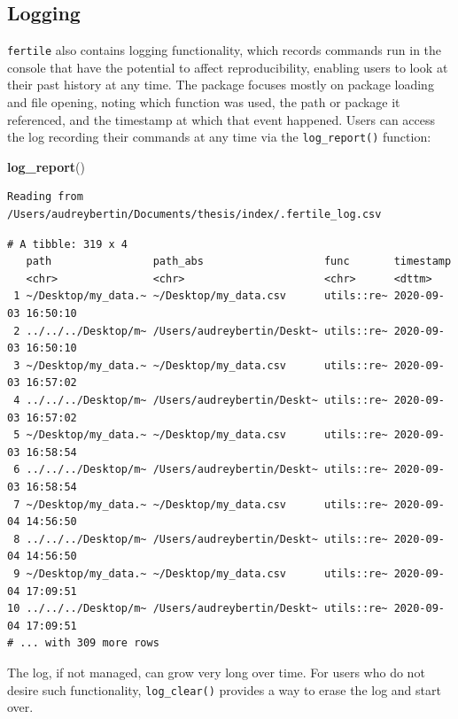 \documentclass[12pt,twoside]{reedthesis}
\newenvironment{Shaded}{\begin{snugshade}}{\end{snugshade}}
\newcommand{\KeywordTok}[1]{\textcolor[rgb]{0.13,0.29,0.53}{\textbf{#1}}}
\newcommand{\NormalTok}[1]{#1}
\begin{document}
\subsection{Logging}\label{logging}

\texttt{fertile} also contains logging functionality, which records
commands run in the console that have the potential to affect
reproducibility, enabling users to look at their past history at any
time. The package focuses mostly on package loading and file opening,
noting which function was used, the path or package it referenced, and
the timestamp at which that event happened. Users can access the log
recording their commands at any time via the \texttt{log\_report()}
function:

\footnotesize
\begin{Shaded}
\begin{Highlighting}[]
\KeywordTok{log_report}\NormalTok{()}
\end{Highlighting}
\end{Shaded}
\begin{verbatim}
Reading from /Users/audreybertin/Documents/thesis/index/.fertile_log.csv
\end{verbatim}
\begin{verbatim}
# A tibble: 319 x 4
   path                path_abs                   func       timestamp          
   <chr>               <chr>                      <chr>      <dttm>             
 1 ~/Desktop/my_data.~ ~/Desktop/my_data.csv      utils::re~ 2020-09-03 16:50:10
 2 ../../../Desktop/m~ /Users/audreybertin/Deskt~ utils::re~ 2020-09-03 16:50:10
 3 ~/Desktop/my_data.~ ~/Desktop/my_data.csv      utils::re~ 2020-09-03 16:57:02
 4 ../../../Desktop/m~ /Users/audreybertin/Deskt~ utils::re~ 2020-09-03 16:57:02
 5 ~/Desktop/my_data.~ ~/Desktop/my_data.csv      utils::re~ 2020-09-03 16:58:54
 6 ../../../Desktop/m~ /Users/audreybertin/Deskt~ utils::re~ 2020-09-03 16:58:54
 7 ~/Desktop/my_data.~ ~/Desktop/my_data.csv      utils::re~ 2020-09-04 14:56:50
 8 ../../../Desktop/m~ /Users/audreybertin/Deskt~ utils::re~ 2020-09-04 14:56:50
 9 ~/Desktop/my_data.~ ~/Desktop/my_data.csv      utils::re~ 2020-09-04 17:09:51
10 ../../../Desktop/m~ /Users/audreybertin/Deskt~ utils::re~ 2020-09-04 17:09:51
# ... with 309 more rows
\end{verbatim}
\normalsize

The log, if not managed, can grow very long over time. For users who do
not desire such functionality, \texttt{log\_clear()} provides a way to
erase the log and start over.
\end{document}
